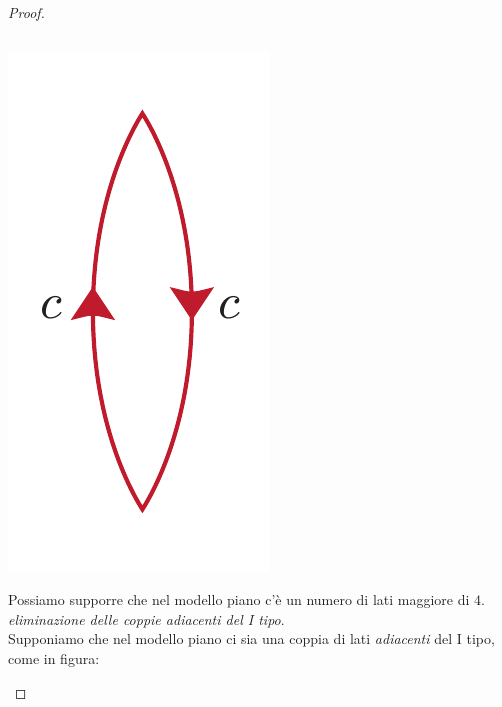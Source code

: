 \begin{proof}{}
\begin{center}
\begin{minipage}{.19\linewidth}
\begin{equation*}
		\end{equation*}
	\end{minipage}
	\begin{minipage}{.20\linewidth}
		\begin{center}
			\includegraphics[trim=0cm 0cm 0cm 0cm, clip, scale=0.35]{images/proj2lines.pdf}
		\end{center}
	\end{minipage}
\end{center}
Possiamo supporre che nel modello piano c'è un numero di lati maggiore di $4$.\\
 \textit{eliminazione delle coppie adiacenti del I tipo}.\\
Supponiamo che nel modello piano ci sia una coppia di lati \textit{adiacenti} del I tipo, come in figura:
\begin{center}

\end{center}
\end{proof}
